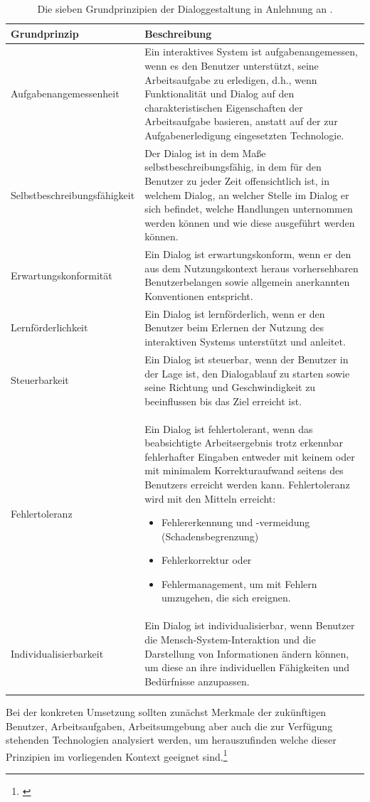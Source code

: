 \begin{center}
\begin{longtable}{|p{5.1cm}|p{9.5cm}|} 
\hline
\textbf{Grundprinzip} & \textbf{Beschreibung} \\ \hline
Aufgabenangemessenheit & Ein interaktives System ist aufgabenangemessen, wenn es den Benutzer unterstützt, seine Arbeitsaufgabe zu erledigen, d.h., wenn Funktionalität und Dialog auf den charakteristischen Eigenschaften der Arbeitsaufgabe basieren, anstatt auf der zur Aufgabenerledigung eingesetzten Technologie. \\ \hline
Selbstbeschreibungsfähigkeit & Der Dialog ist in dem Maße selbstbeschreibungsfähig, in dem für den Benutzer zu jeder Zeit offensichtlich ist, in welchem Dialog, an welcher Stelle im Dialog er sich befindet, welche Handlungen unternommen werden können und wie diese ausgeführt werden können. \\ \hline
Erwartungskonformität & Ein Dialog ist erwartungskonform, wenn er den aus dem Nutzungskontext heraus vorhersehbaren Benutzerbelangen sowie allgemein anerkannten Konventionen entspricht. \\ \hline
Lernförderlichkeit & Ein Dialog ist lernförderlich, wenn er den Benutzer beim Erlernen der Nutzung des interaktiven Systems unterstützt und anleitet. \\ \hline
Steuerbarkeit & Ein Dialog ist steuerbar, wenn der Benutzer in der Lage ist, den Dialogablauf zu starten sowie seine Richtung und Geschwindigkeit zu beeinflussen bis das Ziel erreicht ist. \\ \hline
Fehlertoleranz & Ein Dialog ist fehlertolerant, wenn das beabsichtigte Arbeitsergebnis trotz erkennbar fehlerhafter Eingaben entweder mit keinem oder mit minimalem Korrekturaufwand seitens des Benutzers erreicht werden kann. Fehlertoleranz wird mit den Mitteln erreicht: 
\begin{itemize}\itemsep0pt
  \item Fehlererkennung und -vermeidung (Schadensbegrenzung)
  \item Fehlerkorrektur oder
  \item Fehlermanagement, um mit Fehlern umzugehen, die sich ereignen.
\end{itemize} \\ \hline
Individualisierbarkeit & Ein Dialog ist individualisierbar, wenn Benutzer die Mensch-System-Interaktion und die Darstellung von Informationen ändern können, um diese an ihre individuellen Fähigkeiten und Bedürfnisse anzupassen.\\ \hline
\caption{Die sieben Grundprinzipien der Dialoggestaltung in Anlehnung an \citep[]{ISO9241-110}.}
\label{tab:siebenGrundprinzipien}
\end{longtable}
\end{center}
Bei der konkreten Umsetzung sollten zunächst Merkmale der zukünftigen Benutzer, Arbeitsaufgaben, Arbeitsumgebung aber auch die zur Verfügung stehenden Technologien analysiert werden, um herauszufinden welche dieser Prinzipien im vorliegenden Kontext geeignet sind.\footnote{\cite[vgl.][]{Figl2010}}

